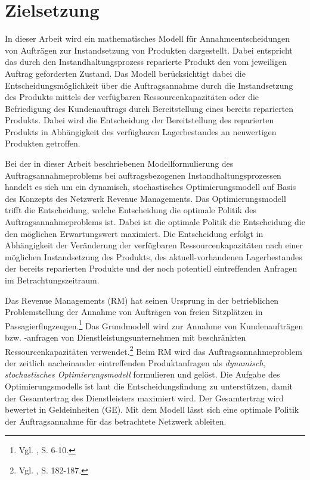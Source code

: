 \section{Zielsetzung}

In dieser Arbeit wird ein mathematisches Modell für Annahmeentscheidungen von Aufträgen zur Instandsetzung von Produkten dargestellt. Dabei entspricht das durch den Instandhaltungsprozess reparierte Produkt den vom jeweiligen Auftrag geforderten Zustand. Das Modell berücksichtigt dabei die Entscheidungsmöglichkeit über die Auftragsannahme durch die Instandsetzung des Produkts mittels der verfügbaren Ressourcenkapazitäten oder die Befriedigung des Kundenauftrags durch Bereitstellung eines bereits reparierten Produkts. Dabei wird die Entscheidung der Bereitstellung des reparierten Produkts in Abhängigkeit des verfügbaren Lagerbestandes an neuwertigen Produkten getroffen.

Bei der in dieser Arbeit beschriebenen Modellformulierung des Auftragsannahmeproblems bei auftragsbezogenen Instandhaltungsprozessen handelt es sich um ein dynamisch, stochastisches Optimierungsmodell auf Basis des Konzepts des Netzwerk Revenue Managements. Das Optimierungsmodell trifft die Entscheidung, welche Entscheidung die optimale Politik des Auftragsannahmeproblems ist. Dabei ist die optimale Politik die Entscheidung die den möglichen Erwartungswert maximiert. Die Entscheidung erfolgt in Abhängigkeit der Veränderung der verfügbaren Ressourcenkapazitäten nach einer möglichen Instandsetzung des Produkts, des aktuell-vorhandenen Lagerbestandes der bereits reparierten Produkte und der noch potentiell eintreffenden Anfragen im Betrachtungszeitraum.

Das Revenue Managements (RM) hat seinen Ursprung in der betrieblichen Problemstellung der Annahme von Aufträgen von freien Sitzplätzen in Passagierflugzeugen.\footnote{Vgl. \cite{talluri2004theory}, S. 6-10.} Das Grundmodell wird zur Annahme von Kundenaufträgen bzw. -anfragen von Dienstleistungsunternehmen mit beschränkten Ressourcenkapazitäten verwendet.\footnote{Vgl. \cite{Petrick:2009aa}, S. 182-187.} %
Beim RM wird das Auftragsannahmeproblem der zeitlich nacheinander eintreffenden Produktanfragen als \textit{dynamisch, stochastisches Optimierungsmodell} formulieren und gelöst.
Die Aufgabe des Optimierungsmodells ist laut \cite{talluri2004theory} die Entscheidungsfindung zu unterstützen, damit der Gesamtertrag des Dienstleisters maximiert wird. Der Gesamtertrag wird bewertet in Geldeinheiten (GE). Mit dem Modell lässt sich eine optimale Politik der Auftragsannahme für das betrachtete Netzwerk ableiten.

